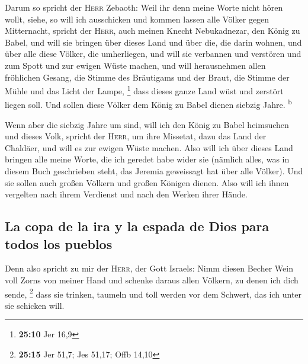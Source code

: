  Darum so spricht der \textsc{Herr} Zebaoth: Weil ihr denn
meine Worte nicht hören wollt,  siehe, so will ich
ausschicken und kommen lassen alle Völker gegen Mitternacht, spricht der
\textsc{Herr}, auch meinen Knecht Nebukadnezar, den König zu Babel, und
will sie bringen über dieses Land und über die, die darin wohnen, und
über alle diese Völker, die umherliegen, und will sie verbannen und
verstören und zum Spott und zur ewigen Wüste machen,  und
will herausnehmen allen fröhlichen Gesang, die Stimme des Bräutigams und
der Braut, die Stimme der Mühle und das Licht der Lampe, \footnote{\textbf{25:10}
  Jer 16,9}  dass dieses ganze Land wüst und zerstört
liegen soll. Und sollen diese Völker dem König zu Babel dienen siebzig
Jahre. \textsuperscript{b}

 Wenn aber die siebzig Jahre um sind, will ich den König
zu Babel heimsuchen und dieses Volk, spricht der \textsc{Herr}, um ihre
Missetat, dazu das Land der Chaldäer, und will es zur ewigen Wüste
machen.  Also will ich über dieses Land bringen alle
meine Worte, die ich geredet habe wider sie (nämlich alles, was in
diesem Buch geschrieben steht, das Jeremia geweissagt hat über alle
Völker).  Und sie sollen auch großen Völkern und großen
Königen dienen. Also will ich ihnen vergelten nach ihrem Verdienst und
nach den Werken ihrer Hände.

\hypertarget{la-copa-de-la-ira-y-la-espada-de-dios-para-todos-los-pueblos}{%
\subsection{La copa de la ira y la espada de Dios para todos los
pueblos}\label{la-copa-de-la-ira-y-la-espada-de-dios-para-todos-los-pueblos}}

 Denn also spricht zu mir der \textsc{Herr}, der Gott
Israels: Nimm diesen Becher Wein voll Zorns von meiner Hand und schenke
daraus allen Völkern, zu denen ich dich sende, \footnote{\textbf{25:15}
  Jer 51,7; Jes 51,17; Offb 14,10}  dass sie trinken,
taumeln und toll werden vor dem Schwert, das ich unter sie schicken
will.

